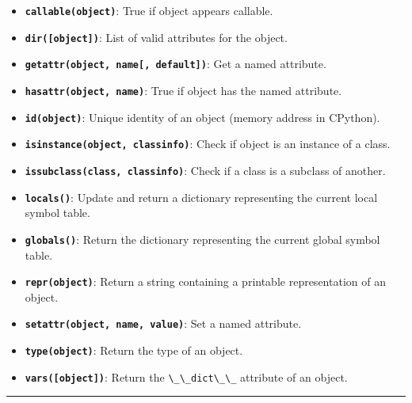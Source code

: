 \begin{itemize}
\tightlist
\item
  \textbf{\passthrough{\lstinline!callable(object)!}}: True if object
  appears callable.
\item
  \textbf{\passthrough{\lstinline!dir([object])!}}: List of valid
  attributes for the object.
\item
  \textbf{\passthrough{\lstinline!getattr(object, name[, default])!}}:
  Get a named attribute.
\item
  \textbf{\passthrough{\lstinline!hasattr(object, name)!}}: True if
  object has the named attribute.
\item
  \textbf{\passthrough{\lstinline!id(object)!}}: Unique identity of an
  object (memory address in CPython).
\item
  \textbf{\passthrough{\lstinline!isinstance(object, classinfo)!}}:
  Check if object is an instance of a class.
\item
  \textbf{\passthrough{\lstinline!issubclass(class, classinfo)!}}: Check
  if a class is a subclass of another.
\item
  \textbf{\passthrough{\lstinline!locals()!}}: Update and return a
  dictionary representing the current local symbol table.
\item
  \textbf{\passthrough{\lstinline!globals()!}}: Return the dictionary
  representing the current global symbol table.
\item
  \textbf{\passthrough{\lstinline!repr(object)!}}: Return a string
  containing a printable representation of an object.
\item
  \textbf{\passthrough{\lstinline!setattr(object, name, value)!}}: Set a
  named attribute.
\item
  \textbf{\passthrough{\lstinline!type(object)!}}: Return the type of an
  object.
\item
  \textbf{\passthrough{\lstinline!vars([object])!}}: Return the
  \passthrough{\lstinline!\_\_dict\_\_!} attribute of an object.
\end{itemize}

\begin{center}\rule{0.5\linewidth}{0.5pt}\end{center}
